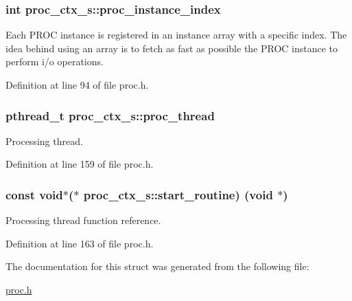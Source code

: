 \subsubsection[{\texorpdfstring{proc\+\_\+instance\+\_\+index}{proc_instance_index}}]{\setlength{\rightskip}{0pt plus 5cm}int proc\+\_\+ctx\+\_\+s\+::proc\+\_\+instance\+\_\+index}\hypertarget{structproc__ctx__s_a3912d4b5eaffcdaefa00f149ca4a8c63}{}\label{structproc__ctx__s_a3912d4b5eaffcdaefa00f149ca4a8c63}
Each P\+R\+OC instance is registered in an instance array with a specific index. The idea behind using an array is to fetch as fast as possible the P\+R\+OC instance to perform i/o operations. 

Definition at line 94 of file proc.\+h.

\subsubsection[{\texorpdfstring{proc\+\_\+thread}{proc_thread}}]{\setlength{\rightskip}{0pt plus 5cm}pthread\+\_\+t proc\+\_\+ctx\+\_\+s\+::proc\+\_\+thread}\hypertarget{structproc__ctx__s_a09ad60355584215cfeb4d5589ee390b9}{}\label{structproc__ctx__s_a09ad60355584215cfeb4d5589ee390b9}
Processing thread. 

Definition at line 159 of file proc.\+h.

\subsubsection[{\texorpdfstring{start\+\_\+routine}{start_routine}}]{\setlength{\rightskip}{0pt plus 5cm}const void$\ast$($\ast$ proc\+\_\+ctx\+\_\+s\+::start\+\_\+routine) (void $\ast$)}\hypertarget{structproc__ctx__s_a1149ce1c28aae8e553c85125e30be661}{}\label{structproc__ctx__s_a1149ce1c28aae8e553c85125e30be661}
Processing thread function reference. 

Definition at line 163 of file proc.\+h.



The documentation for this struct was generated from the following file\+:\begin{DoxyCompactItemize}
\item 
\hyperlink{proc_8h}{proc.\+h}\end{DoxyCompactItemize}
